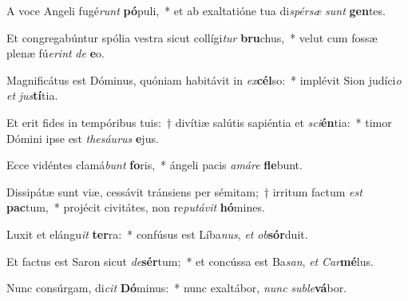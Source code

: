 \item A voce Angeli fugé\textit{runt} \textbf{pó}puli,~* et ab exaltatióne tua di\textit{spér}\textit{sæ} \textit{sunt} \textbf{gen}tes.
\item Et congregabúntur spólia vestra sicut collígi\textit{tur} \textbf{bru}chus,~* velut cum fossæ plenæ fú\textit{e}\textit{rint} \textit{de} \textbf{e}o.
\item Magnificátus est Dóminus, quóniam habitávit in \textit{ex}\textbf{cél}so:~* implévit Sion judíci\textit{o} \textit{et} \textit{jus}\textbf{tí}tia.
\item Et erit fides in tempóribus tuis:~† divítiæ salútis sapiéntia et \textit{sci}\textbf{én}tia:~* timor Dómini ipse est \textit{the}\textit{sáu}\textit{rus} \textbf{e}jus.
\item Ecce vidéntes clamá\textit{bunt} \textbf{fo}ris,~* ángeli pacis \textit{a}\textit{má}\textit{re} \textbf{fle}bunt.
\item Dissipátæ sunt viæ, cessávit tránsiens per sémitam;~† irritum factum \textit{est} \textbf{pac}tum,~* projécit civitátes, non re\textit{pu}\textit{tá}\textit{vit} \textbf{hó}mines.
\item Luxit et elángu\textit{it} \textbf{ter}ra:~* confúsus est Líba\textit{nus}, \textit{et} \textit{ob}\textbf{sór}duit.
\item Et factus est Saron sicut \textit{de}\textbf{sér}tum;~* et concússa est Ba\textit{san}, \textit{et} \textit{Car}\textbf{mé}lus.
\item Nunc consúrgam, di\textit{cit} \textbf{Dó}minus:~* nunc exaltábor, \textit{nunc} \textit{sub}\textit{le}\textbf{vá}bor.
